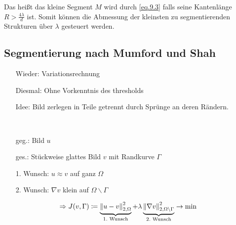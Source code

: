 Das heißt das kleine Segment $M$ wird durch \ref{eq.9.3}  falls seine Kantenlänge $R>\frac{4 \lambda}{d}$ ist. Somit können die Abmessung der kleinsten zu segmentierenden Strukturen über $\lambda$ gesteuert werden.

\subsection{Segmentierung nach Mumford und Shah}

\begin{minipage}{.65\textwidth}
    \begin{enumerate}
        \item[Wieder:] Variationsrechnung
        \item[Diesmal:] Ohne Vorkenntnis des thresholds
        \item[Idee:] Bild zerlegen in  Teile getrennt durch Sprünge an deren Rändern.
        \item[] \
        \item[geg.:] Bild $u$
        \item[ges.:] Stückweise glattes Bild $v$ mit Randkurve $\Gamma$
    \end{enumerate}
    \begin{enumerate}
        \item[1. Wunsch:] $u \approx v$ auf ganz $\Omega$
        \item[2. Wunsch:] $\nabla v$ klein auf $\Omega \backslash \Gamma$
    \end{enumerate}
\end{minipage}%
\begin{minipage}{0.3\textwidth}
\begin{center}
\end{center}
\end{minipage}

\[\Rightarrow J(v,\Gamma)  \coloneqq  \underbrace{\left\| u-v \right\|_{2,\Omega}^2}_{1. \text{ Wunsch}}  + \lambda \underbrace{\left\| \nabla v \right\|_{2,\Omega \backslash \Gamma}^2}_{2. \text{ Wunsch}} \to \min \]


